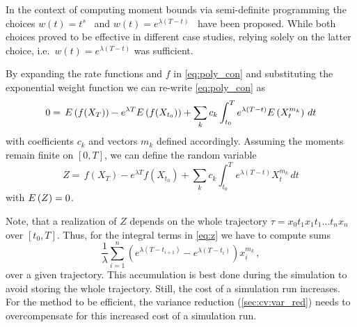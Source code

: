 In the context of computing moment bounds via semi-definite programming
the choices $w(t)=t^s$~\cite{sakurai2019bounding} and $w(t)=e^{\lambda(T - t)}$~\cite{dowdy2018dynamic}
have been proposed.
While both choices proved to be effective in different case studies, relying solely on the latter choice,
i.e.\ $w(t)=e^{\lambda(T - t)}$ was sufficient.

By expanding the rate functions and $f$ in \eqref{eq:poly_con} and substituting the
exponential weight function we can re-write \eqref{eq:poly_con} as
\begin{equation}\label{eq:simpl_exp}
        0 =\,
         {E}\left(f(X_{T})\right)
        - e^{\lambda T}{E}\left(f(X_{t_0})\right)
        + \sum_{k}c_k\int_{t_0}^{T}e^{\lambda(T-t)}{E}\left(X_t^{m_k}\right)\,dt
\end{equation}
with coefficients $c_k$ and vectors $m_k$ defined accordingly.
Assuming the moments remain finite on $[0,T]$, we can define the random variable
\begin{equation}\label{eq:z}
        Z =\,
         f(X_{T})
        - e^{\lambda T}f(X_{t_0})
        + \sum_{k}c_k\int_{t_0}^{T}e^{\lambda(T-t)}X_t^{m_k}\,dt
\end{equation}
with ${E}\left(Z\right)=0$.

Note, that a realization of $Z$ depends on the whole trajectory $\tau=x_0t_1 x_1 t_1 \dots\allowbreak t_n x_n$ over $[t_0,T]$.
Thus, for the integral terms
in \eqref{eq:z} we have to compute sums
\begin{equation}\label{eq:dis_int}
    \frac{1}{\lambda}\sum_{i=1}^n\left(e^{\lambda(T - t_{i+1})}
    - e^{\lambda(T-t_i)}\right)x_i^{m_k}\,,
\end{equation}
over a given trajectory.
This accumulation is best done during the simulation to avoid storing the whole trajectory.
Still, the cost of a simulation run increases.
For the method to be efficient, the variance reduction (\autoref{sec:cv:var_red}) needs
to overcompensate for this increased cost of a simulation run.

